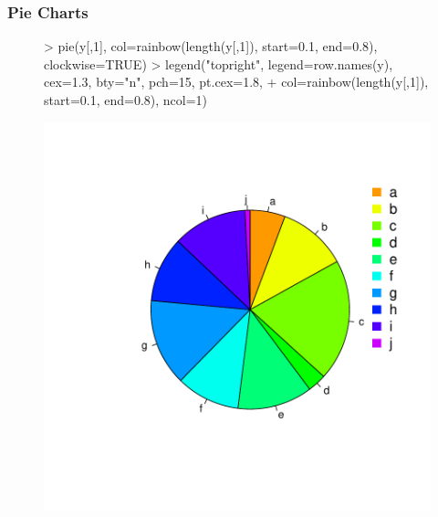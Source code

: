\documentclass{beamer}
\begin{document}
\begin{frame}[containsverbatim]  
	\frametitle{Pie Charts}
\scriptsize
\begin{figure}
  \centering
\begin{Schunk}
\begin{Sinput}
> pie(y[,1], col=rainbow(length(y[,1]), start=0.1, end=0.8), clockwise=TRUE)
> legend("topright", legend=row.names(y), cex=1.3, bty="n", pch=15, pt.cex=1.8, 
+ col=rainbow(length(y[,1]), start=0.1, end=0.8), ncol=1) 
\end{Sinput}
\end{Schunk}
\includegraphics{fig--019}
\label{fig:pie}
\end{figure}
\end{frame}
\end{document}
